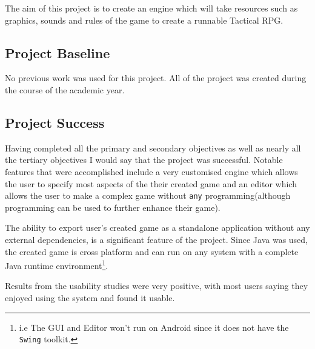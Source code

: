 The aim of this project is to create an engine which will take resources such as graphics, sounds and rules of the game to create a runnable Tactical RPG.

\subsection{Project Baseline}
\label{sub:baseline}

No previous work was used for this project. All of the project was created during the course of the academic year.

\subsection{Project Success}

Having completed all the primary and secondary objectives as well as nearly all the tertiary objectives I would say that the project was successful.  Notable features that were accomplished include a very customised engine which allows the user to specify most aspects of the their created game and an editor which allows the user to make a complex game without \texttt{any} programming(although programming can be used to further enhance their game). 

The ability to export user's created game as a standalone application without any external dependencies, is a significant feature of the project. Since Java was used, the created game is cross platform and can run on any system with  a complete Java runtime environment\footnote{i.e The GUI and Editor won't run on Android since it does not have the \texttt{Swing} toolkit.}.  

Results from the usability studies were very positive, with most users saying they enjoyed using the system and found it usable. 
